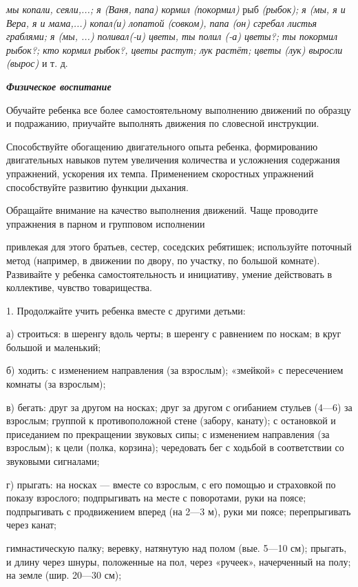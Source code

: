 \documentclass[a5paper]{book}
\renewcommand{\emph}[1]{\textit{#1}}
\begin{document}
\emph{мы копали, сеяли,...; я (Ваня, папа) кормил (покормил)} рыб
\emph{(рыбок); я (мы, я и Вера, я и мама,...) копал(и) лопатой (совком),
папа (он) сгребал листья граблями; я (мы, ...) поливал(-и) цветы, ты
полил (-а) цветы?; ты покормил рыбок?; кто кормил рыбок?, цветы растут;
лук растёт; цветы (лук) выросли (вырос)} и т. д.

\emph{\textbf{Физическое воспитание}}

Обучайте ребенка все более самостоятельному выполнению движений по
образцу и подражанию, приучайте выполнять движения по словесной
инструкции.

Способствуйте обогащению двигательного опыта ребенка, формированию
двигательных навыков путем увеличения количества и усложнения содержания
упражнений, ускорения их темпа. Применением скоростных упражнений
способствуйте развитию функции дыхания.

Обращайте внимание на качество выполнения движений. Чаще проводите
упражнения в парном и групповом исполнении

привлекая для этого братьев, сестер, соседских ребятишек; используйте
поточный метод (например, в движении по двору, по участку, по большой
комнате). Развивайте у ребенка самостоятельность и инициативу, умение
действовать в коллективе, чувство товарищества.

1. Продолжайте учить ребенка вместе с другими детьми:

а) строиться: в шеренгу вдоль черты; в шеренгу с равнением по носкам; в
круг большой и маленький;

б) ходить: с изменением направления (за взрослым); «змейкой» с
пересечением комнаты (за взрослым);

в) бегать: друг за другом на носках; друг за другом с огибанием стульев
(4---6) за взрослым; группой к противоположной стене (забору, канату); с
остановкой и приседанием по прекращении звуковых сипы; с изменением
направления (за взрослым); к цели (полка, корзина); чередовать бег с
ходьбой в соответствии со звуковыми сигналами;

г) прыгать: на носках --- вместе со взрослым, с его помощью и страховкой
по показу взрослого; подпрыгивать на месте с поворотами, руки на поясе;
подпрыгивать с продвижением вперед (на 2---3 м), руки ми поясе;
перепрыгивать через канат;

гимнастическую палку; веревку, натянутую над полом (вые. 5---10 см);
прыгать, и длину через шнуры, положенные на пол, через «ручеек»,
начерченный на полу; на земле (шир. 20---30 см);
\end{document}
